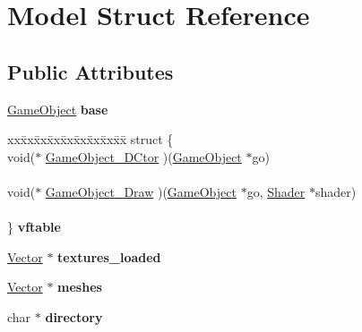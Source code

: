 \hypertarget{struct_model}{}\section{Model Struct Reference}
\label{struct_model}
\subsection*{Public Attributes}
\begin{DoxyCompactItemize}
\item 
\mbox{\label{struct_model_ad967c4a01bf1dbc5571e43d9d2306dfd}} 
\mbox{\hyperlink{struct_game_object}{Game\+Object}} {\bfseries base}
\item 
\mbox{\label{struct_model_a9a9a145aeeefbe4dd58863905c6c8dcf}} 
\begin{tabbing}
xx\=xx\=xx\=xx\=xx\=xx\=xx\=xx\=xx\=\kill
struct \{\\
\>void($\ast$ \mbox{\hyperlink{struct_model_a84a8aa41fa533f08e9eda7d657f0e389}{GameObject\_DCtor}} )(\mbox{\hyperlink{struct_game_object}{GameObject}} $\ast$go)\\
\>\\
\>void($\ast$ \mbox{\hyperlink{struct_model_aecd30a10f690702cf87061f719bb152b}{GameObject\_Draw}} )(\mbox{\hyperlink{struct_game_object}{GameObject}} $\ast$go, \mbox{\hyperlink{struct_shader}{Shader}} $\ast$shader)\\
\>\\
\} {\bfseries vftable}\\

\end{tabbing}\item 
\mbox{\label{struct_model_accd7bb1fe0a04ac8279ca59b93a32282}} 
\mbox{\hyperlink{struct_vector}{Vector}} $\ast$ {\bfseries textures\+\_\+loaded}
\item 
\mbox{\label{struct_model_a0758f3a89688029449562e727d5c50cb}} 
\mbox{\hyperlink{struct_vector}{Vector}} $\ast$ {\bfseries meshes}
\item 
\mbox{\label{struct_model_a09f63af25f642c45d21b3d9e00863f7e}} 
char $\ast$ {\bfseries directory}
\end{DoxyCompactItemize}


